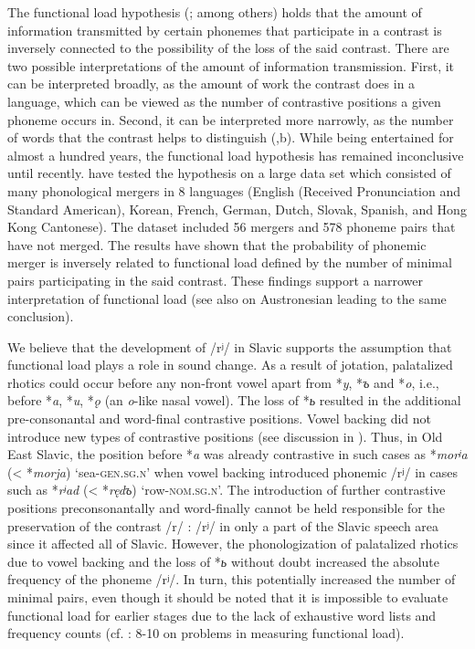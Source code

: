 \documentclass[output=paper]{langscibook}
\begin{document}
The functional load hypothesis (\citealt{Jakobson1931,Mathesius1931,Trubetzkoy1939,Martinet1952}; among others) holds that the amount of information transmitted by certain phonemes that participate in a contrast is inversely connected to the possibility of the loss of the said contrast. There are two possible interpretations of the amount of information transmission. First, it can be interpreted broadly, as the amount of work the contrast does in a language, which can be viewed as the number of contrastive positions a given phoneme occurs in. Second, it can be interpreted more narrowly, as the number of words that the contrast helps to distinguish (\citealt{King1967a},b). While being entertained for almost a hundred years, the functional load hypothesis has remained inconclusive until recently. \citet{WedelEtAl2013b} have tested the hypothesis on a large data set which consisted of many phonological mergers in 8 languages (English (Received Pronunciation and Standard American), Korean, French, German, Dutch, Slovak, Spanish, and Hong Kong Cantonese). The dataset included 56 mergers and 578 phoneme pairs that have not merged. The results have shown that the probability of phonemic merger is inversely related to functional load defined by the number of minimal pairs participating in the said contrast. These findings support a narrower interpretation of functional load (see also \citealt{Bouchard-CoteEtAl2013} on Austronesian leading to the same conclusion).


We believe that the development of /rʲ/ in Slavic supports the assumption that functional load plays a role in sound change. As a result of jotation, palatalized rhotics could occur before any non-front vowel apart from *\textit{y}, *\textit{{ъ}} and *\textit{o}, i.e., before *\textit{a}, *\textit{u}, *\textit{ǫ} (an \textit{o}{}-like nasal vowel). The loss of *\textit{{ь}} resulted in the additional pre-consonantal and word-final contrastive positions. Vowel backing did not introduce new types of contrastive positions (see discussion in ). Thus, in Old East Slavic, the position before *\textit{a} was already contrastive in such cases as *\textit{morʲ}\textit{a} (< *\textit{morja}) ‘sea-\textsc{gen.sg.n}’ when vowel backing introduced phonemic /rʲ/ in cases such as *\textit{rʲ}\textit{ad} (< *\textit{ręd{ъ}}) ‘row-\textsc{nom.sg.n}’. The introduction of further contrastive positions preconsonantally and word-finally cannot be held responsible for the preservation of the contrast /r/ : /rʲ/ in only a part of the Slavic speech area since it affected all of Slavic. However, the phonologization of palatalized rhotics due to vowel backing and the loss of *\textit{{ь}} without doubt increased the absolute frequency of the phoneme /rʲ/. In turn, this potentially increased the number of minimal pairs, even though it should be noted that it is impossible to evaluate functional load for earlier stages due to the lack of exhaustive word lists and frequency counts (cf. \citealt{Martinet1952}: 8-10 on problems in measuring functional load).
\end{document}

